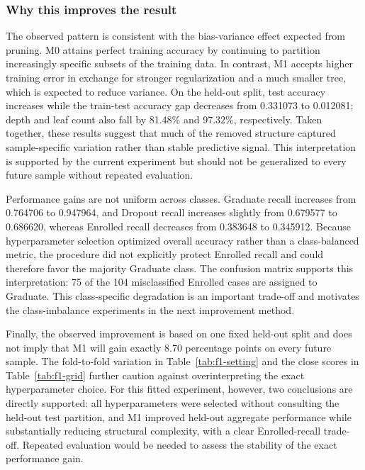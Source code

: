 \subsubsection{Why this improves the result}

The observed pattern is consistent with the bias-variance effect expected
from pruning. M0 attains perfect training accuracy by continuing to partition
increasingly specific subsets of the training data. In contrast, M1 accepts
higher training error in exchange for stronger regularization and a much
smaller tree, which is expected to reduce variance. On the held-out split,
test accuracy increases while the train-test accuracy gap decreases from
0.331073 to 0.012081; depth and leaf count also fall by 81.48\% and 97.32\%,
respectively. Taken together, these results suggest that much of the removed
structure captured sample-specific variation rather than stable predictive
signal. This interpretation is supported by the current experiment but
should not be generalized to every future sample without repeated evaluation.

Performance gains are not uniform across classes. Graduate recall increases
from 0.764706 to 0.947964, and Dropout recall increases slightly from 0.679577
to 0.686620, whereas Enrolled recall decreases from 0.383648 to 0.345912.
Because hyperparameter selection optimized overall accuracy rather than a
class-balanced metric, the procedure did not explicitly protect Enrolled
recall and could therefore favor the majority Graduate class. The confusion
matrix supports this interpretation: 75 of the 104 misclassified Enrolled
cases are assigned to Graduate. This class-specific degradation is an
important trade-off and motivates the class-imbalance experiments in the next
improvement method.

Finally, the observed improvement is based on one fixed held-out split and
does not imply that M1 will gain exactly 8.70 percentage points on every future
sample. The fold-to-fold variation in Table~\ref{tab:f1-setting} and the close
scores in Table~\ref{tab:f1-grid} further caution against overinterpreting the
exact hyperparameter choice. For this fitted experiment, however, two
conclusions are directly supported: all hyperparameters were selected without
consulting the held-out test partition, and M1 improved held-out aggregate
performance while substantially reducing structural complexity, with a clear
Enrolled-recall trade-off. Repeated evaluation would be needed to assess the
stability of the exact performance gain.
